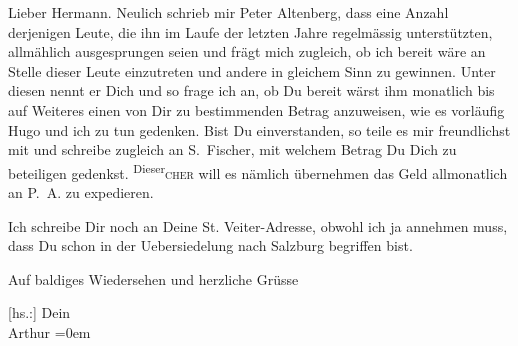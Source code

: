 \pstart{}Lieber Hermann.\pend\vspace{0.5em}
\pstart
           Neulich schrieb mir Peter Altenberg, dass eine
               Anzahl derjenigen Leute, die ihn im Laufe der letzten Jahre regelmässig
               unterstützten, allmählich ausgesprungen seien und frägt mich zugleich, ob ich bereit
               wäre an Stelle dieser Leute einzutreten und andere in gleichem Sinn zu gewinnen.
               Unter diesen nennt er Dich und so frage ich an, ob Du bereit wärst ihm monatlich bis
               auf Weiteres einen von Dir zu bestimmenden Betrag anzuweisen, wie es vorläufig Hugo und ich zu tun gedenken. Bist Du
               einverstanden, so teile es mir freundlichst mit und schreibe zugleich an S. Fischer, mit welchem Betrag Du Dich zu
               beteiligen ge{\pb}denkst. \substVorne{}\textsuperscript{Dieser}\substDazwischen{}\textsc{cher}\substHinten{} will es nämlich übernehmen das Geld allmonatlich an P. A. zu expedieren.\pend
           
\pstart
           Ich schreibe Dir noch an Deine St.
               Veiter-Adresse, obwohl ich ja annehmen muss, dass Du schon in der Uebersiedelung
               nach Salzburg begriffen bist.\pend
           
\pstart
           Auf baldiges Wiedersehen und herzliche Grüsse\pend
           
\pstart
           {[}hs.:{]} Dein{\\[\baselineskip]}\spacefill\mbox{Arthur}\pend
           \leftskip=0em{}\endnumbering{}  \newcommand{\dateiname}{L02099}\newcommand{\titel}{Arthur Schnitzler an Hermann Bahr, 16. 11. 1912}\newcommand{\editorInnen}{Herausgegeben von Martin Anton Müller}
